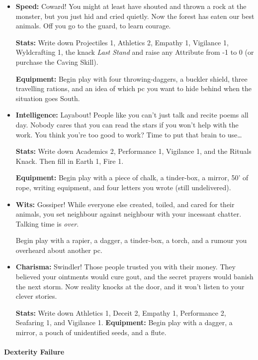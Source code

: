 \begin{multicols}{2}
\begin{itemize}
  \item
  \textbf{Speed:}
  Coward!
  You might at least have shouted and thrown a rock at the monster, but you just hid and cried quietly.
  Now the forest has eaten our best animals.
  Off you go to the \gls{guard}, to learn courage.

  \textbf{Stats:}
  Write down Projectiles 1, Athletics 2, Empathy 1, Vigilance 1, Wyldcrafting 1, the knack \textit{Last Stand} and raise any Attribute from -1 to 0 (or purchase the Caving Skill).

  \textbf{Equipment:}
  Begin play with four throwing-daggers, a buckler shield, three travelling rations, and an idea of which \gls{pc} you want to hide behind when the situation goes South.
  \item
  \textbf{Intelligence:}
  Layabout!
  People like you can't just talk and recite poems all day.
  Nobody cares that you can read the stars if you won't help with the work.
  You think you're too good to work?
  Time to put that brain to use\ldots

  \textbf{Stats:}
  Write down Academics 2, Performance 1, Vigilance 1, and the Rituals Knack.
  Then fill in Earth 1, Fire 1.

  \textbf{Equipment:}
  Begin play with a piece of chalk, a tinder-box, a mirror, 50' of rope, writing equipment, and four letters you wrote (still undelivered).
  \item
  \textbf{Wits:}
  Gossiper!
  While everyone else created, toiled, and cared for their animals, you set neighbour against neighbour with your incessant chatter.
  Talking time is \emph{over}.

  Begin play with a rapier, a dagger, a tinder-box, a torch, and a rumour you overheard about another \gls{pc}.
  \item
  \textbf{Charisma:}
  Swindler!
  Those people trusted you with their money.
  They believed your ointments would cure gout, and the secret prayers would banish the next storm.
  Now reality knocks at the door, and it won't listen to your clever stories.

  \textbf{Stats:}
  Write down Athletics 1, Deceit 2, Empathy 1, Performance 2, Seafaring 1, and Vigilance 1.
  \textbf{Equipment:}
  Begin play with a dagger, a mirror, a pouch of unidentified seeds, and a flute.

\end{itemize}

\paragraph{Dexterity Failure}


\end{multicols}

